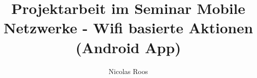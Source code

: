 





\title{Projektarbeit im Seminar Mobile Netzwerke - Wifi basierte Aktionen (Android App)} %
\author{Nicolas Roos}


\setcounter{page}{1}


% 

\tableofcontents
\newpage











\listoffigures
{}
%


%



